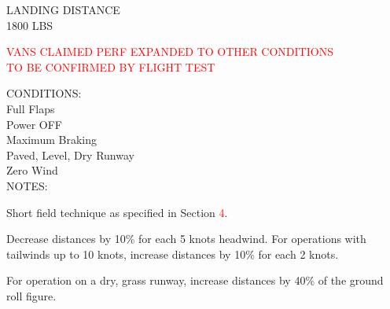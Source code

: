 \begin{sidewaysfigure}[t]
\begin{center}
\begin{perfhdr}LANDING DISTANCE\\
1800 LBS
\end{perfhdr}
\Large
\textcolor{red}{VANS CLAIMED PERF EXPANDED TO OTHER CONDITIONS}\vspace{1ex}\\
\textcolor{red}{TO BE CONFIRMED BY FLIGHT TEST}\normalsize \vspace{5ex}\\

\begin{minipage}{9in}
  \begin{flushleft}
    CONDITIONS:\\
    Full Flaps\\
    Power OFF\\
    Maximum Braking\\
    Paved, Level, Dry Runway\\
    Zero Wind\\

    NOTES:
    \begin{enumerate*}
      \item Short field technique as specified in Section \textcolor{red}{4}.
      \item Decrease distances by 10\% for each 5 knots headwind.  For operations with tailwinds up to 10 knots, increase distances by 10\% for each 2 knots.
      \item For operation on a dry, grass runway, increase distances by 40\% of the ground roll figure.
      \end{enumerate*}
    \end{flushleft}
\end{minipage}\\

\vspace{\perfnoteskip}


\end{center}
\end{sidewaysfigure}
